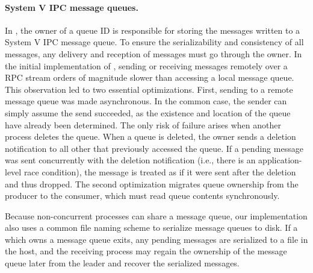 \paragraph{System V IPC message queues.} In \graphene{}, the owner of a queue ID is responsible for 
storing the messages written to a System V IPC message queue.
To ensure the serializability and consistency of all messages, any delivery and reception of messages must go through the owner.  
In the initial implementation of \thelibos{}, sending or receiving messages remotely over a RPC stream
orders of magnitude slower than accessing a local message queue.
This observation led to two essential optimizations.  
First, sending to a remote
message queue was made asynchronous.  In the common case, the sender can simply assume 
the send succeeded, as the existence and location of the queue have already been determined.
The only risk of failure arises when another process deletes the queue.
When a queue is deleted, the owner sends a deletion notification to all other \picoprocs{}
that previously accessed the queue.
If a pending message was sent concurrently with the deletion notification 
(i.e., there is an application-level race condition), 
the message is treated as if it were sent after the deletion and thus dropped.
The second optimization migrates queue ownership from the producer to the consumer,
which must read queue contents synchronously.


Because non-concurrent processes can share a message queue,
our implementation also uses a common file naming scheme to serialize message queues to disk.
If a \picoproc{} which owns a message queue exits, 
any pending messages are serialized to a file in the host,
and the receiving process may regain the ownership of the message queue later from the leader and recover the serialized messages.



